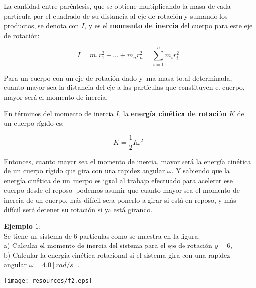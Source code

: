 \documentclass[letter,11pt]{article}
\begin{document}
La cantidad entre paréntesis, que se obtiene multiplicando la masa de cada
partícula por el cuadrado de su distancia al eje de rotación y sumando los
productos, se denota con $I$, y es el \textbf{momento de inercia} del cuerpo
para este eje de rotación:

\begin{equation}
    I = m_1 r^2_1 + ... + m_n r^2_n = \sum_{i=1}^{n} m_i r^2_i
\label{momentodeinercia}
\end{equation}

Para un cuerpo con un eje de rotación dado y una masa total determinada, cuanto
mayor sea la distancia del eje a las partículas que constituyen el cuerpo, mayor
será el momento de inercia.

En términos del momento de inercia $I$, la \textbf{energía cinética de rotación}
$K$ de un cuerpo rígido es:

\begin{equation}
    K = \frac{1}{2} I \omega^2
\label{cineticarotacional}
\end{equation}

Entonces, cuanto mayor sea el momento de inercia, mayor será la energía cinética
de un cuerpo rígido que gira con una rapidez angular $\omega$. Y sabiendo que la
energía cinética de un cuerpo es igual al trabajo efectuado para acelerar ese
cuerpo desde el reposo, podemos asumir que cuanto mayor sea el momento de
inercia de un cuerpo, más difícil sera ponerlo a girar si está en reposo, y más
difícil será detener su rotación si ya está girando.

\vspace{0.75cm}
\begin{minipage}[b]{.4\linewidth}
\textbf{Ejemplo 1}:\\
Se tiene un sistema de 6 partículas como se muestra en la figura. \\

a) Calcular el momento de inercia del sistema para el eje de rotación $y = 6$, \\
b) Calcular la energía cinética rotacional si el sistema gira con una rapidez
angular $\omega = 4.0 [rad/s]$.
\end{minipage}\hfill
\begin{minipage}{.5\linewidth}
\texttt{[image: resources/f2.eps]}
\end{minipage}
\end{document}
